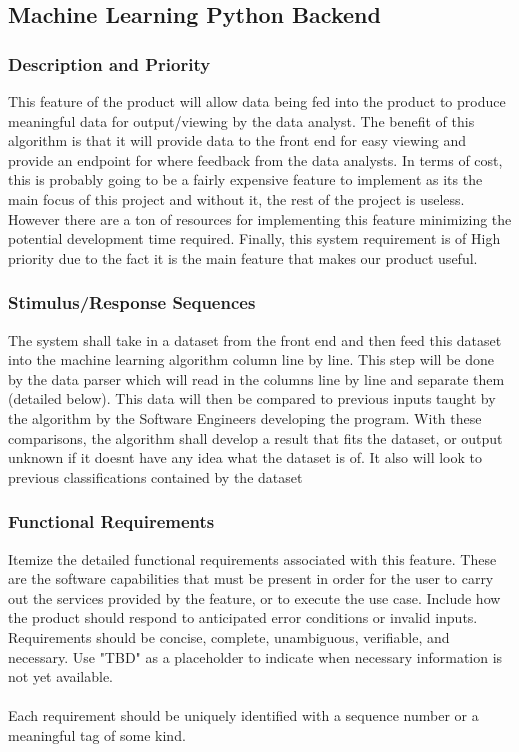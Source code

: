 \documentclass[12pt,oneside,letterpaper]{article}
\begin{document}
  \subsection{Machine Learning Python Backend}
\subsubsection{Description and Priority}
This feature of the product will allow data being fed into the product to produce meaningful data for output/viewing by the data analyst. The benefit of this algorithm is that it will provide data to the front end for easy viewing and provide an endpoint for where feedback from the data analysts. In terms of cost, this is probably going to be a fairly expensive feature to implement as its the main focus of this project and without it, the rest of the project is useless. However there are a ton of resources for implementing this feature minimizing the potential development time required. Finally, this system requirement is of High priority due to the fact it is the main feature that makes our product useful. 
\subsubsection{Stimulus/Response Sequences}
The system shall take in a dataset from the front end and then feed this dataset into the machine learning algorithm column line by line. This step will be done by the data parser which will read in the columns line by line and separate them (detailed below). This data will then be compared to previous inputs taught by the algorithm by the Software Engineers developing the program. With these comparisons, the algorithm shall develop a result that fits the dataset, or output unknown if it doesnt have any idea what the dataset is of. It also will look to previous classifications contained by the dataset 
\subsubsection{Functional Requirements}
Itemize the detailed functional requirements associated with this feature. These are the software capabilities that must be present in order for the user to carry out the services provided by the feature, or to execute the use case. Include how the product should respond to anticipated error conditions or invalid inputs. Requirements should be concise, complete, unambiguous, verifiable, and necessary. Use "TBD" as a placeholder to indicate when necessary information is not yet available.\\
\\
Each requirement should be uniquely identified with a sequence number or a meaningful tag of some kind.
\end{document}
